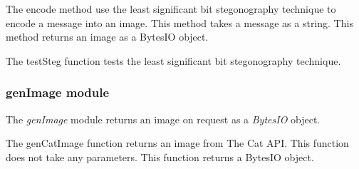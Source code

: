 \documentclass[letterpaper,10pt,english]{sphinxmanual}
\begin{document}
\begin{fulllineitems}
\begin{fulllineitems}
\end{fulllineitems}


\begin{fulllineitems}
\label{Image_Manipulation:Image_Manipulation.stegByteStream.Steg.encode}
The encode method use the least significant bit stegonography
technique to encode a message into an image.
This method takes a message as a string.
This method returns an image as a BytesIO object.

\end{fulllineitems}


\end{fulllineitems}


\begin{fulllineitems}
\label{Image_Manipulation:Image_Manipulation.stegByteStream.testSteg}
The testSteg function tests the least significant bit stegonography technique.

\end{fulllineitems}



\subsubsection{genImage module}
\label{Image_Manipulation:genimage-module}
The \emph{genImage} module returns an image on request as a \emph{BytesIO} object.
\label{Image_Manipulation:module-Image_Manipulation.genImage}

\begin{fulllineitems}
\label{Image_Manipulation:Image_Manipulation.genImage.genCatImage}
The genCatImage function returns an image from The Cat API.
This function does not take any parameters.
This function returns a BytesIO object.

\end{fulllineitems}
\end{document}
